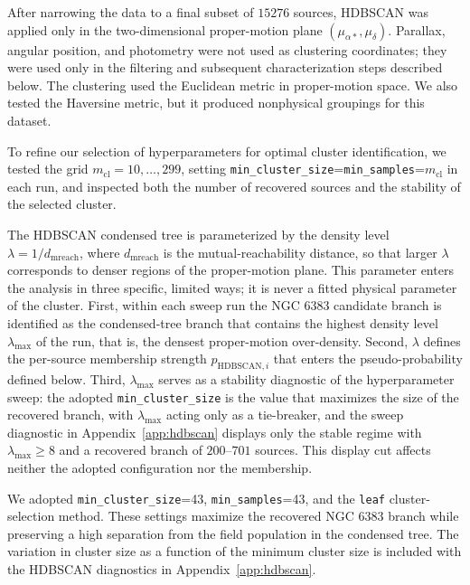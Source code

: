 \documentclass{aa}
\begin{document}
After narrowing the data to a final subset of $15276$ sources, HDBSCAN was applied only in the two-dimensional proper-motion plane $(\mu_{\alpha*},\mu_\delta)$. Parallax, angular position, and photometry were not used as clustering coordinates; they were used only in the filtering and subsequent characterization steps described below. The clustering used the Euclidean metric in proper-motion space. We also tested the Haversine metric, but it produced nonphysical groupings for this dataset.

To refine our selection of hyperparameters for optimal cluster identification, we tested the grid $m_{\mathrm{cl}}=10,\ldots,299$, setting \texttt{min\_cluster\_size}=\texttt{min\_samples}=$m_{\mathrm{cl}}$ in each run, and inspected both the number of recovered sources and the stability of the selected cluster.

The HDBSCAN condensed tree is parameterized by the density level $\lambda=1/d_{\mathrm{mreach}}$, where $d_{\mathrm{mreach}}$ is the mutual-reachability distance, so that larger $\lambda$ corresponds to denser regions of the proper-motion plane. This parameter enters the analysis in three specific, limited ways; it is never a fitted physical parameter of the cluster. First, within each sweep run the NGC 6383 candidate branch is identified as the condensed-tree branch that contains the highest density level $\lambda_{\mathrm{max}}$ of the run, that is, the densest proper-motion over-density. Second, $\lambda$ defines the per-source membership strength $p_{\mathrm{HDBSCAN},i}$ that enters the pseudo-probability defined below. Third, $\lambda_{\mathrm{max}}$ serves as a stability diagnostic of the hyperparameter sweep: the adopted \texttt{min\_cluster\_size} is the value that maximizes the size of the recovered branch, with $\lambda_{\mathrm{max}}$ acting only as a tie-breaker, and the sweep diagnostic in Appendix~\ref{app:hdbscan} displays only the stable regime with $\lambda_{\mathrm{max}}\geq8$ and a recovered branch of $200$--$701$ sources. This display cut affects neither the adopted configuration nor the membership.

We adopted \texttt{min\_cluster\_size}=43, \texttt{min\_samples}=43, and the \texttt{leaf} cluster-selection method. These settings maximize the recovered NGC 6383 branch while preserving a high separation from the field population in the condensed tree. The variation in cluster size as a function of the minimum cluster size is included with the HDBSCAN diagnostics in Appendix~\ref{app:hdbscan}.
\end{document}
